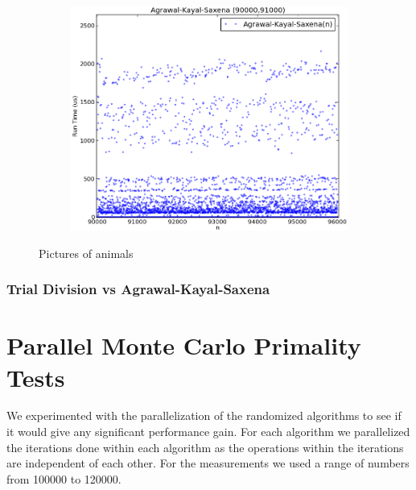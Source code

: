 \documentclass[compressed,final,notitlepage,narroweqnarray,inline,twoside,]{ieee}
\begin{document}
\begin{figure}[H]
        \centering
        \begin{subfigure}[b]{0.5\textwidth}
                \includegraphics[width=\textwidth]{../images/AKS_large}
                \label{fig:gull}
        \end{subfigure}
        \caption{Pictures of animals}\label{fig:animals}
\end{figure}
\subsubsection{Trial Division vs Agrawal-Kayal-Saxena}
\section{Parallel Monte Carlo Primality Tests}
We experimented with the parallelization of the randomized algorithms to see if it would give any significant performance gain. For each algorithm we parallelized the iterations done within each algorithm as the operations within the iterations are independent of each other. For the measurements we used a range of numbers from 100000 to 120000. 
\end{document}
